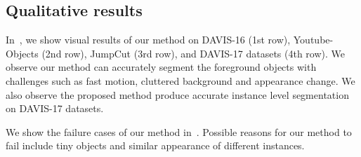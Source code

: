 \vspace*{-0.15cm}
\subsection{Qualitative results}

In~, we show  visual results of our method on DAVIS-16 (1st row), Youtube-Objects (2nd row), JumpCut (3rd row),  and DAVIS-17 datasets (4th row). We observe our method can accurately segment the foreground objects with challenges such as fast motion, cluttered background and appearance change. We also observe the proposed method produce accurate instance level segmentation on DAVIS-17 datasets.


We show the failure cases of our method in~. Possible reasons for our method to fail include tiny objects and similar appearance of different instances.


